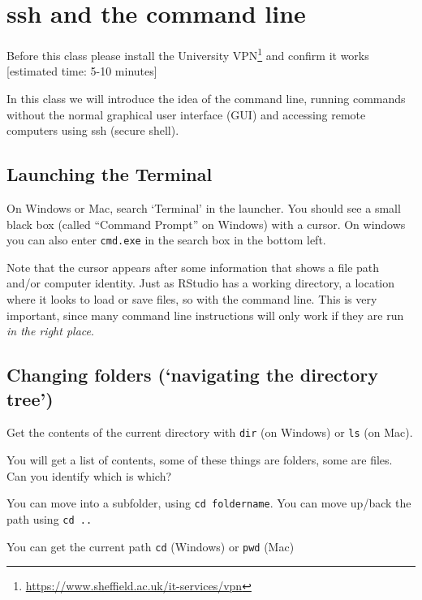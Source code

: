 \documentclass[
  12pt,
  a5paper,
]{book}
\DeclareRobustCommand{\href}[2]{#2\footnote{\url{#1}}}
\begin{document}
\hypertarget{ssh-and-the-command-line}{%
\chapter{ssh and the command line}\label{ssh-and-the-command-line}}

Before this class please install the \href{https://www.sheffield.ac.uk/it-services/vpn}{University VPN} and confirm it works {[}estimated time: 5-10 minutes{]}

In this class we will introduce the idea of the command line, running commands without the normal graphical user interface (GUI) and accessing remote computers using ssh (secure shell).

\hypertarget{launching-the-terminal}{%
\section{Launching the Terminal}\label{launching-the-terminal}}

On Windows or Mac, search `Terminal' in the launcher. You should see a small black box (called ``Command Prompt'' on Windows) with a cursor. On windows you can also enter \texttt{cmd.exe} in the search box in the bottom left.

Note that the cursor appears after some information that shows a file path and/or computer identity. Just as RStudio has a working directory, a location where it looks to load or save files, so with the command line. This is very important, since many command line instructions will only work if they are run \emph{in the right place}.

\hypertarget{changing-folders-navigating-the-directory-tree}{%
\section{Changing folders (`navigating the directory tree')}\label{changing-folders-navigating-the-directory-tree}}

Get the contents of the current directory with \texttt{dir} (on Windows) or \texttt{ls} (on Mac).

You will get a list of contents, some of these things are folders, some are files. Can you identify which is which?

You can move into a subfolder, using \texttt{cd\ foldername}. You can move up/back the path using \texttt{cd\ ..}

You can get the current path \texttt{cd} (Windows) or \texttt{pwd} (Mac)
\end{document}
